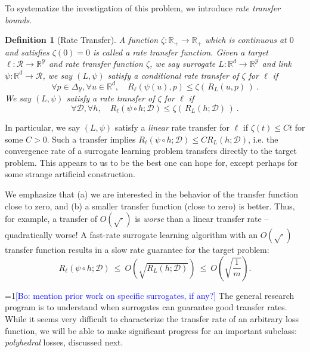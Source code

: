 \documentclass{article}
\newtheorem{definition}{Definition}
\newcommand{\Comments}{1}
\newcommand{\mynote}[2]{\ifnum\Comments=1\textcolor{#1}{#2}\fi}
\newcommand{\bo}[1]{\mynote{blue}{[Bo: #1]}}
\newcommand{\reals}{\mathbb{R}}
\newcommand{\simplex}{\Delta_\Y}
\newcommand{\D}{\mathcal{D}}
\newcommand{\R}{\mathcal{R}}
\newcommand{\Y}{\mathcal{Y}}
\begin{document}
To systematize the investigation of this problem, we introduce \emph{rate transfer bounds}.

\begin{definition}[Rate Transfer]\label{def:transfer}
  A function $\zeta : \reals_+ \to \reals_+$ which is continuous at $0$ and satisfies $\zeta(0) = 0$ is called a \emph{rate transfer function.}
	Given a target $\ell:\R\to\reals^\Y$ and rate transfer function $\zeta$, we say surrogate $L:\reals^d\to\reals^\Y$ and link $\psi : \reals^d \to \R$, we say $(L,\psi)$ satisfy a \emph{conditional rate transfer} of $\zeta$ for $\ell$ if
  \begin{equation}
    \label{eq:conditional-transfer}
    \forall p\in\simplex, \forall u\in\reals^d, \quad R_\ell(\psi(u),p) \leq \zeta(\, R_L(u,p) \,)~.
  \end{equation}
  We say $(L,\psi)$ satisfy a \emph{rate transfer} of $\zeta$ for $\ell$ if
  \begin{equation}
    \label{eq:transfer}
    \forall \D, \forall h, \quad R_\ell(\psi \circ h;\D) \leq \zeta(\, R_L(h;\D) \,)~.
  \end{equation}
\end{definition}
In particular, we say $(L,\psi)$ satisfy a \emph{linear} rate transfer for $\ell$ if $\zeta(t) \leq Ct$ for some $C > 0$.
Such a transfer implies $R_{\ell}(\psi \circ h;\D) \leq C R_L(h;\D)$, i.e. the convergence rate of a surrogate learning problem transfers directly to the target problem.
This appears to us to be the best one can hope for, except perhaps for some strange artificial construction.

We emphasize that (a) we are interested in the behavior of the transfer function close to zero, and (b) a smaller transfer function (close to zero) is better.
Thus, for example, a transfer of $O(\sqrt{\cdot})$ is \emph{worse} than a linear transfer rate -- quadratically worse!
A fast-rate surrogate learning algorithm with an $O(\sqrt{\cdot})$ transfer function results in a slow rate guarantee for the target problem:
  \[ R_{\ell}(\psi \circ h; \D) ~\leq~ O\left(\sqrt{R_L(h;\D)}\right) ~\leq~ O\left(\sqrt{\frac{1}{m}}\right) . \]

\bo{mention prior work on specific surrogates, if any?}
The general research program is to understand when surrogates can guarantee good transfer rates.
While it seems very difficult to characterize the transfer rate of an arbitrary loss function, we will be able to make significant progress for an important subclass: \emph{polyhedral} losses, discussed next.
\end{document}
